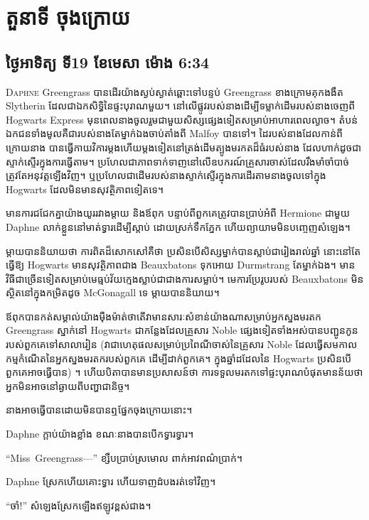 \chapter{តួនាទី ចុងក្រោយ}

\section{ថ្ងៃអាទិត្យ ទី19 ខែមេសា ម៉ោង 6:34\pm}

\lettrine{D}{aphne} Greengrass បានដើរយ៉ាងស្ងប់ស្ងាត់ឆ្ពោះទៅបន្ទប់ Greengrass ខាងក្រោមគុកងងឹត Slytherin ដែលជាឯកសិទ្ធិនៃផ្ទះបុរាណមួយ។ នៅលើផ្លូវរបស់នាងដើម្បីទម្លាក់ដើមរបស់នាងចេញពី Hogwarts Express មុនពេលនាងចូលរួមជាមួយសិស្សផ្សេងទៀតសម្រាប់អាហារពេលល្ងាច។ តំបន់ឯកជនទាំងមូលគឺជារបស់នាងតែម្នាក់ឯងចាប់តាំងពី Malfoy បានទៅ។ ដៃរបស់នាងដែលកាន់ពីក្រោយនាង បានធ្វើកាយវិការម្តងហើយម្តងទៀតនៅត្រង់ដើមត្បូងមរកតដ៏ធំរបស់នាង ដែលហាក់ដូចជាស្ទាក់ស្ទើរក្នុងការធ្វើតាម។ ប្រហែលជាភាពទាក់ទាញនៅលើឧបករណ៍គ្រួសារចាស់ដែលរឹងមាំចាំបាច់ត្រូវតែអនុវត្តឡើងវិញ។ ឬប្រហែលជាដើមរបស់នាងស្ទាក់ស្ទើរក្នុងការដើរតាមនាងចូលទៅក្នុង Hogwarts ដែលមិនមានសុវត្ថិភាពទៀតទេ។

មានការជជែកគ្នាយ៉ាងយូររវាងម្តាយ និងឪពុក បន្ទាប់ពីពួកគេត្រូវបានប្រាប់អំពី Hermione ជាមួយ Daphne លាក់ខ្លួននៅមាត់ទ្វារដើម្បីស្តាប់ ដោយស្រក់ទឹកភ្នែក ហើយព្យាយាមមិនបញ្ចេញសំឡេង។

ម្តាយបាននិយាយថា ការពិតដ៏សោកសៅគឺថា ប្រសិនបើសិស្សម្នាក់បានស្លាប់ជារៀងរាល់ឆ្នាំ នោះនៅតែធ្វើឱ្យ Hogwarts មានសុវត្ថិភាពជាង Beauxbatons ទុកអោយ Durmstrang តែម្នាក់ឯង។ មានវិធីជាច្រើនទៀតសម្រាប់មេធ្មប់វ័យក្មេងស្លាប់ជាជាងការសម្លាប់។ មេ​ការ​ប្រែរូប​របស់ Beauxbatons មិន​ស្ថិត​នៅ​ក្នុង​កម្រិត​ដូច McGonagall ទេ ម្តាយ​បាន​និយាយ។

ឪពុកបានកត់សម្គាល់យ៉ាងម៉ឺងម៉ាត់ថាតើវាមានសារៈសំខាន់យ៉ាងណាសម្រាប់អ្នកស្នងមរតក Greengrass ស្នាក់នៅ Hogwarts ជាកន្លែងដែលគ្រួសារ Noble ផ្សេងទៀតទាំងអស់បានបញ្ជូនកូនរបស់ពួកគេទៅសាលារៀន (វាជាហេតុផលសម្រាប់ប្រពៃណីចាស់នៃគ្រួសារ Noble ដែលធ្វើសមកាលកម្មកំណើតនៃអ្នកស្នងមរតករបស់ពួកគេ ដើម្បីដាក់ពួកគេ។ ក្នុងឆ្នាំដដែលនៃ Hogwarts ប្រសិនបើពួកគេអាចធ្វើបាន) ។ ហើយ​បិតា​បាន​មាន​ប្រសាសន៍​ថា ការ​ទទួល​មរតក​ទៅ​ផ្ទះ​បុរាណ​បំផុត​មាន​ន័យ​ថា អ្នក​មិន​អាច​នៅ​ឆ្ងាយ​ពី​បញ្ហា​ជា​និច្ច។

នាង​អាច​ធ្វើ​បាន​ដោយ​មិន​បាន​ឮ​ផ្នែក​ចុង​ក្រោយ​នោះ។

Daphne ក្តាប់​យ៉ាង​ខ្លាំង ខណៈ​នាង​បាន​បើក​ទ្វារ​ទ្វារ។

“Miss~Greengrass—” ខ្សឹបប្រាប់ស្រមោល ពាក់អាវពណ៌ប្រាក់។

Daphne ស្រែក​ហើយ​គោះ​ទ្វារ ហើយ​ទាញ​ដំបង​រត់​ទៅ​វិញ។

“ចាំ!” សំឡេង​ស្រែក​ឡើង​ឥឡូវ​ខ្ពស់​ជាង។

